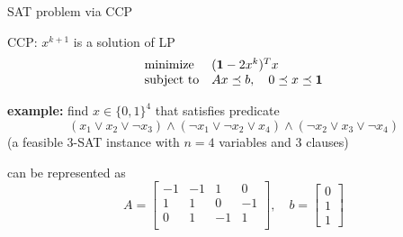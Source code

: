 \documentclass[aspectratio=169,11pt]{beamer}
\begin{document}
\begin{frame}{SAT problem via CCP}
\BIT
\item CCP: $x^{k+1}$ is a solution of LP
\[
\begin{array}{ll}
\mbox{minimize} & (\mathbf 1 - 2 x^k) ^T x \\
\mbox{subject to} & Ax \preceq b, \quad 0 \preceq x \preceq \mathbf 1
\end{array}
\]
\item \textbf{example:} 
find $x \in \{0, 1\}^4$ that satisfies predicate
\[
(x_1 \lor x_2 \lor \neg x_3) \land (\neg x_1 \lor \neg x_2 \lor x_4)
\land (\neg x_2 \lor x_3 \lor \neg x_4)
\]
(a feasible 3-SAT instance with $n=4$ variables and $3$ clauses)
\item can be represented as
\[
A = \left[\begin{array}{rrrr}
-1 & -1 & 1 & 0 \\
1 & 1 & 0 & -1 \\
0 & 1 & -1 & 1 \\
\end{array}\right],
\quad b = \left[\begin{array}{r}
0 \\ 1 \\ 1
\end{array}\right]
\]
\EIT
\end{frame}
\end{document}
